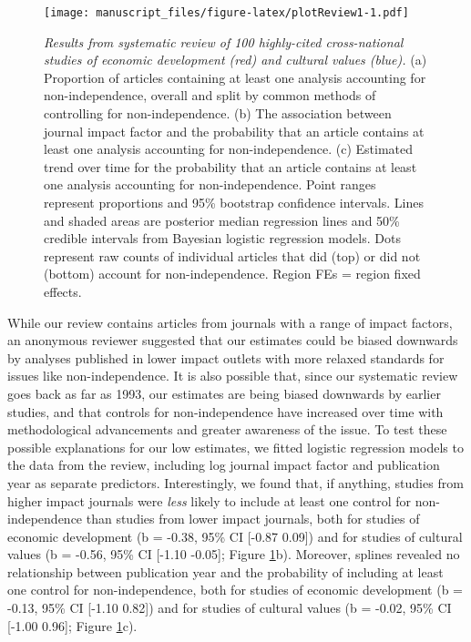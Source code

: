 \documentclass[
  man,floatsintext]{apa6}
\begin{document}
\begin{figure}
\centering
\texttt{[image: manuscript\_files/figure-latex/plotReview1-1.pdf]}
\caption{\label{fig:plotReview1}\emph{Results from systematic review of 100 highly-cited cross-national studies of economic development (red) and cultural values (blue).} (a) Proportion of articles containing at least one analysis accounting for non-independence, overall and split by common methods of controlling for non-independence. (b) The association between journal impact factor and the probability that an article contains at least one analysis accounting for non-independence. (c) Estimated trend over time for the probability that an article contains at least one analysis accounting for non-independence. Point ranges represent proportions and 95\% bootstrap confidence intervals. Lines and shaded areas are posterior median regression lines and 50\% credible intervals from Bayesian logistic regression models. Dots represent raw counts of individual articles that did (top) or did not (bottom) account for non-independence. Region FEs = region fixed effects.}
\end{figure}

While our review contains articles from journals with a range of impact factors, an anonymous reviewer suggested that our estimates could be biased downwards by analyses published in lower impact outlets with more relaxed standards for issues like non-independence. It is also possible that, since our systematic review goes back as far as 1993, our estimates are being biased downwards by earlier studies, and that controls for non-independence have increased over time with methodological advancements and greater awareness of the issue. To test these possible explanations for our low estimates, we fitted logistic regression models to the data from the review, including log journal impact factor and publication year as separate predictors. Interestingly, we found that, if anything, studies from higher impact journals were \emph{less} likely to include at least one control for non-independence than studies from lower impact journals, both for studies of economic development (b = -0.38, 95\% CI {[}-0.87 0.09{]}) and for studies of cultural values (b = -0.56, 95\% CI {[}-1.10 -0.05{]}; Figure \ref{fig:plotReview1}b). Moreover, splines revealed no relationship between publication year and the probability of including at least one control for non-independence, both for studies of economic development (b = -0.13, 95\% CI {[}-1.10 0.82{]}) and for studies of cultural values (b = -0.02, 95\% CI {[}-1.00 0.96{]}; Figure \ref{fig:plotReview1}c).
\end{document}
